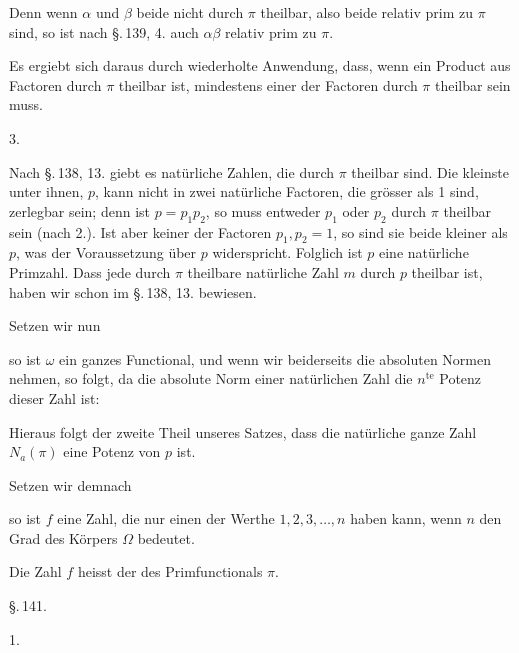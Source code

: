 
Denn wenn $\alpha$ und $\beta$ beide nicht durch $\pi$ theilbar, also beide relativ prim zu $\pi$ sind, so ist nach \S.\,139, 4. auch $\alpha \beta$ relativ prim zu $\pi$.

Es ergiebt sich daraus durch wiederholte Anwendung, dass, wenn ein Product aus  Factoren durch $\pi$ theilbar ist, mindestens einer der Factoren durch $\pi$ theilbar sein muss.

3. 

Nach \S.\,138, 13. giebt es natürliche Zahlen, die durch $\pi$ theilbar sind. Die kleinste unter ihnen, $p$, kann nicht in zwei natürliche Factoren, die grösser als 1 sind, zerlegbar sein; denn ist $p = p_1 p_2$, so muss entweder $p_1$ oder $p_2$ durch $\pi$ theilbar sein (nach 2.). Ist aber keiner der Factoren $p_1, p_2 = 1$, so sind sie beide kleiner als $p$, was der Voraussetzung über $p$ widerspricht. Folglich ist $p$ eine natürliche Primzahl. Dass jede durch $\pi$ theilbare natürliche Zahl $m$ durch $p$ theilbar ist, haben wir schon im \S.\,138, 13. bewiesen.

Setzen wir nun


so ist $\omega$ ein ganzes Functional, und wenn wir beiderseits die absoluten Normen nehmen, so folgt, da die absolute Norm einer natürlichen Zahl die $n^{\text{te}}$ Potenz dieser Zahl ist:


Hieraus folgt der zweite Theil unseres Satzes, dass die natürliche ganze Zahl $N_a (\pi)$ eine Potenz von $p$ ist.

Setzen wir demnach


so ist $f$ eine Zahl, die nur einen der Werthe $1, 2, 3, \dots, n$ haben kann, wenn $n$ den Grad des Körpers $\Omega$ bedeutet.

Die Zahl $f$ heisst der  des Primfunctionals $\pi$.

\begin{center}
\S.\,141.

\end{center}

1. 
